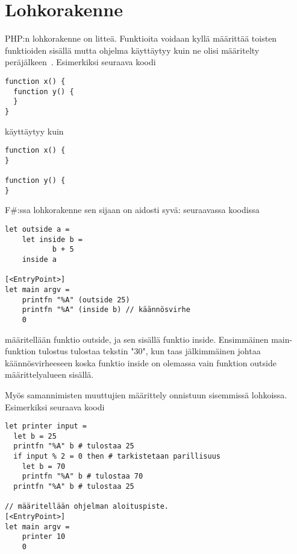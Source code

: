\section{Lohkorakenne}


PHP:n lohkorakenne on litteä. Funktioita voidaan kyllä määrittää toisten funktioiden sisällä mutta ohjelma käyttäytyy kuin ne olisi määritelty peräjälkeen~\cite{stackoverflow_1}. Esimerkiksi seuraava koodi

\lstset{language=PHP,
	basicstyle=\ttfamily,
	breaklines=true,
	columns=fullflexible}

\begin{lstlisting}
function x() {
  function y() {
  }
}
\end{lstlisting}

käyttäytyy kuin

\begin{lstlisting}
function x() {
}

function y() {
}
\end{lstlisting}

F\#:ssa lohkorakenne sen sijaan on aidosti syvä: seuraavassa koodissa


\lstset{
	language=FSharp,
	basicstyle=\ttfamily,
	breaklines=true,
	columns=fullflexible
}

\begin{lstlisting}
let outside a =
    let inside b =
           b + 5
    inside a

[<EntryPoint>]
let main argv =
    printfn "%A" (outside 25)
    printfn "%A" (inside b) // käännösvirhe
    0
\end{lstlisting}

määritellään funktio outside, ja sen sisällä funktio inside. Ensimmäinen main-funktion tulostus tulostaa tekstin "30", kun taas jälkimmäinen johtaa käännösvirheeseen koska funktio inside on olemassa vain funktion outside määrittelyalueen sisällä.

Myös samannimisten muuttujien määrittely onnistuun sisemmissä lohkoissa. Esimerkiksi seuraava koodi

\begin{lstlisting}
let printer input =
  let b = 25
  printfn "%A" b # tulostaa 25
  if input % 2 = 0 then # tarkistetaan parillisuus
    let b = 70
    printfn "%A" b # tulostaa 70
  printfn "%A" b # tulostaa 25

// määritellään ohjelman aloituspiste.
[<EntryPoint>]
let main argv =
    printer 10
    0
\end{lstlisting}

